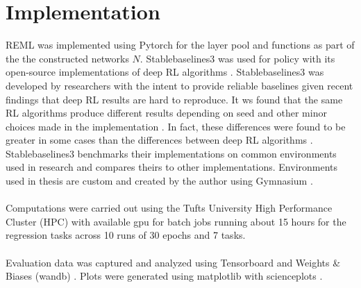 \section{Implementation}
REML was implemented using Pytorch for the layer pool and functions as part of the 
the constructed networks $N$. Stablebaselines3 was used for policy with its open-source 
implementations of deep RL algorithms \cite{pytorch, RafHilGleKanErnDor:21}. 
Stablebaselines3 was developed by researchers with the intent to 
provide reliable baselines given recent findings that deep RL results are hard to 
reproduce. It ws found that the same RL algorithms produce different results depending 
on seed and other minor choices made in the implementation \cite{HenIslBacPinPreMeg:18}. 
In fact, these differences were found to be greater in some cases than the differences between
deep RL algorithms \cite{EngIlySanTsi:20}. Stablebaselines3 benchmarks their implementations
on common environments used in research and compares theirs to other implementations. 
Environments used in thesis are custom and created by the author using Gymnasium \cite{gymnasium}.
\\\\
Computations were carried out using the Tufts University High Performance Cluster (HPC) 
with available gpu for batch jobs running about 15 hours for the regression tasks across 10 runs 
of 30 epochs and 7 tasks. 
\\\\
Evaluation data was captured and analyzed using Tensorboard and Weights \& Biases (wandb)
\cite{tensorflow2015-whitepaper, wandb}. Plots were generated using matplotlib with 
scienceplots \cite{matplotlib, SciencePlots}.


